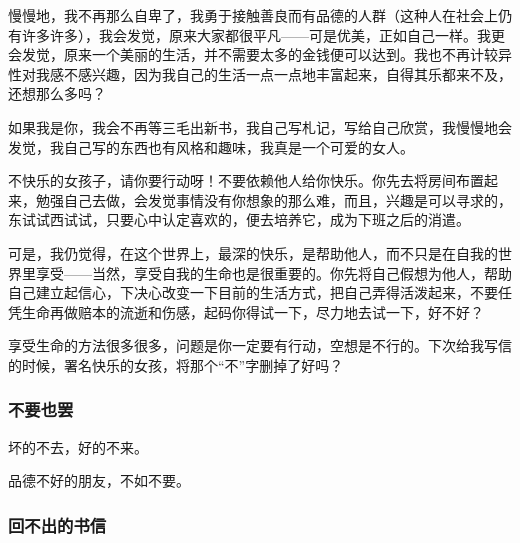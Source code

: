 \par 慢慢地，我不再那么自卑了，我勇于接触善良而有品德的人群（这种人在社会上仍有许多许多），我会发觉，原来大家都很平凡——可是优美，正如自己一样。我更会发觉，原来一个美丽的生活，并不需要太多的金钱便可以达到。我也不再计较异性对我感不感兴趣，因为我自己的生活一点一点地丰富起来，自得其乐都来不及，还想那么多吗？
\par 如果我是你，我会不再等三毛出新书，我自己写札记，写给自己欣赏，我慢慢地会发觉，我自己写的东西也有风格和趣味，我真是一个可爱的女人。
\par 不快乐的女孩子，请你要行动呀！不要依赖他人给你快乐。你先去将房间布置起来，勉强自己去做，会发觉事情没有你想象的那么难，而且，兴趣是可以寻求的，东试试西试试，只要心中认定喜欢的，便去培养它，成为下班之后的消遣。
\par 可是，我仍觉得，在这个世界上，最深的快乐，是帮助他人，而不只是在自我的世界里享受——当然，享受自我的生命也是很重要的。你先将自己假想为他人，帮助自己建立起信心，下决心改变一下目前的生活方式，把自己弄得活泼起来，不要任凭生命再做赔本的流逝和伤感，起码你得试一下，尽力地去试一下，好不好？
\par 享受生命的方法很多很多，问题是你一定要有行动，空想是不行的。下次给我写信的时候，署名快乐的女孩，将那个“不”字删掉了好吗？
\par {}
\par {}


\subsubsection{不要也罢}

\par {}
\par 坏的不去，好的不来。
\par 品德不好的朋友，不如不要。
\par {}

\subsubsection{回不出的书信}

